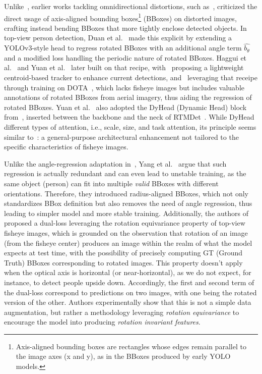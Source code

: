 \documentclass[twocolumn]{svjour3}          %
\begin{document}
Unlike~\cite{yang2024improved}, earlier works tackling omnidirectional distortions, such as~\cite{yang2018object}, criticized the direct usage of axis-aligned bounding boxes\footnote{Axis-aligned bounding boxes are rectangles whose edges remain parallel to the image axes (x and y), as in the BBoxes produced by early YOLO models.} (BBoxes) on distorted images, crafting instead bending BBoxes that more tightly enclose detected objects. In top-view person detection, Duan et al.~\cite{duan2020rapid} made this explicit by extending a YOLOv3-style head to regress rotated BBoxes with an additional angle term $\hat{b_{\theta}}$ and a modified loss handling the periodic nature of rotated BBoxes. Haggui et al.~\cite{haggui2024centroid} and Yuan et al.~\cite{yuan2023rotated} later built on that recipe, with~\cite{haggui2024centroid} proposing a lightweight centroid-based tracker to enhance current detections, and~\cite{yuan2023rotated} leveraging that receipe through training on DOTA~\cite{xia2018dota}, which lacks fisheye images but includes valuable annotations of rotated BBoxes from aerial imagery, thus aiding the regression of rotated BBoxes. Yuan et al.~\cite{yuan2023rotated} also adopted the DyHead (Dynamic Head) block from~\cite{dai2021dynamic}, inserted between the backbone and the neck of RTMDet~\cite{rtmdet}. While DyHead different types of attention, i.e., scale, size, and task attention, its principle seems similar to~\cite{yang2024improved}: a general-purpose architectural enhancement not tailored to the specific characteristics of fisheye images.

Unlike the angle-regression adaptation in~\cite{duan2020rapid, yuan2023rotated, haggui2024centroid, dai2021dynamic}, Yang et al.~\cite{yang2023large} argue that such regression is actually redundant and can even lead to unstable training, as the same object (person) can fit into multiple \textit{valid} BBoxes with different orientations. Therefore, they introduced radius-aligned BBoxes, which not only standardizes BBox definition but also removes the need of angle regression, thus leading to simpler model and more stable training. Additionally, the authors of~\cite{yang2023large} proposed a dual-loss leveraging the rotation equivariance property of top-view fisheye images, which is grounded on the observation that rotation of an image (from the fisheye center) produces an image within the realm of what the model expects at test time, with the possibility of precisely computing GT (Ground Truth) BBoxes corresponding to rotated images. This property doesn't apply when the optical axis is horizontal (or near-horizontal), as we do not expect, for instance, to detect people upside down. Accordingly, the first and second term of the dual-loss correspond to predictions on two images, with one being the rotated version of the other. Authors experimentally show that this is not a simple data augmentation, but rather a methodology leveraging \textit{rotation equivariance} to encourage the model into producing \textit{rotation invariant features}.
\end{document}
